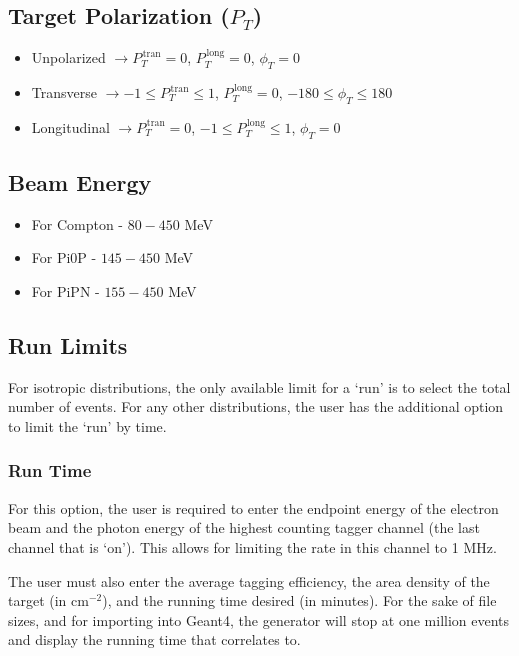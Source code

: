 \documentclass[twoside,letterpaper,12pt]{article}
\begin{document}
\subsection{Target Polarization ($P_{T}$)}
\begin{itemize}
\item Unpolarized $\rightarrow P_{T}^{\,\mathrm{tran}}=0$, $P_{T}^{\,\mathrm{long}}=0$, $\phi_{T}=0$
\item Transverse $\rightarrow -1\leq P_{T}^{\,\mathrm{tran}}\leq 1$, $P_{T}^{\,\mathrm{long}}=0$, $-180\leq \phi_{T}\leq 180$
\item Longitudinal  $\rightarrow P_{T}^{\,\mathrm{tran}}=0$, $-1\leq P_{T}^{\,\mathrm{long}}\leq 1$, $\phi_{T}=0$
\end{itemize}

\subsection{Beam Energy}
\begin{itemize}
\item For Compton - $80-450$ MeV
\item For Pi0P - $145-450$ MeV
\item For PiPN - $155-450$ MeV
\end{itemize}

\subsection{Run Limits}
For isotropic distributions, the only available limit for a `run' is to select the total number of events. For any other distributions, the user has the additional option to limit the `run' by time.

\subsubsection{Run Time}
For this option, the user is required to enter the endpoint energy of the electron beam and the photon energy of the highest counting tagger channel (the last channel that is `on'). This allows for limiting the rate in this channel to 1 MHz.

The user must also enter the average tagging efficiency, the area density of the target (in cm$^{-2}$), and the running time desired (in minutes). For the sake of file sizes, and for importing into Geant4, the generator will stop at one million events and display the running time that correlates to.
\end{document}
